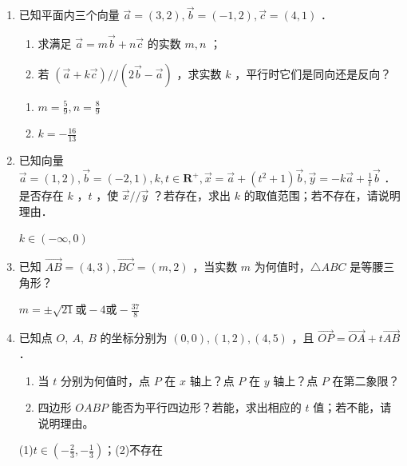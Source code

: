 \begin{enumerate}
\item 已知平面内三个向量 $\vec{a}=(3,2), \vec{b}=(-1,2), \vec{c}=(4,1)$ ．
\begin{enumerate}
    \item 求满足 $\vec{a}=m \vec{b}+n \vec{c}$ 的实数 $m, n$ ；
    \item 若 $(\vec{a}+k \vec{c}) / /(2 \vec{b}-\vec{a})$ ，求实数 $k$ ，平行时它们是同向还是反向？
\end{enumerate}
\begin{jieda}
    \begin{enumerate}
        \item $m=\frac{5}{9}, n=\frac{8}{9}$
        \item $k=-\frac{16}{13}$
    \end{enumerate}
\end{jieda}

\item 已知向量 $\vec{a}=(1,2), \vec{b}=(-2,1), k, t \in \mathbf{R}^{+}, \vec{x}=\vec{a}+\left(t^2+1\right) \vec{b}, \vec{y}=-k \vec{a}+\frac{1}{t} \vec{b}$ ．是否存在 $k$ ，$t$ ，使 $\vec{x} / / \vec{y}$ ？若存在，求出 $k$ 的取值范围；若不存在，请说明理由．
\begin{jieda}
    $k\in(-\infty,0)$
\end{jieda}

\item 已知 $\vec{AB}=(4,3), \vec{BC}=(m, 2)$ ，当实数 $m$ 为何值时，$\triangle A B C$ 是等腰三角形？
\begin{jieda}
    $m=\pm\sqrt{21}或-4或-\frac{37}{8}$
\end{jieda}

\item 已知点 $O, ~ A, ~ B$ 的坐标分别为 $(0,0),(1,2),(4,5)$ ，且 $\overrightarrow{O P}=\overrightarrow{O A}+t \overrightarrow{A B}$ ．
\begin{enumerate}
    \item 当 $t$ 分别为何值时，点 $P$ 在 $x$ 轴上？点 $P$ 在 $y$ 轴上？点 $P$ 在第二象限？
    \item 四边形 $O A B P$ 能否为平行四边形？若能，求出相应的 $t$ 值；若不能，请说明理由。
\end{enumerate}
\begin{jieda}
    (1)$t\in(-\frac{2}{3},-\frac{1}{3})$；(2)不存在
\end{jieda}
\end{enumerate}

